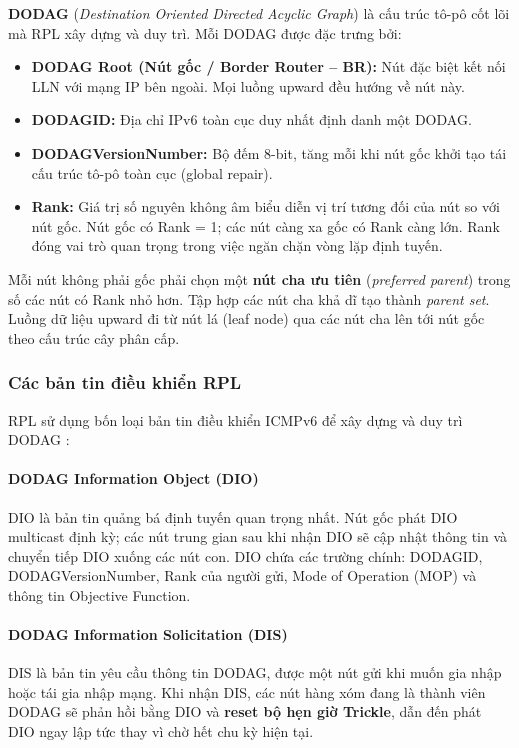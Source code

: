 \textbf{DODAG} (\textit{Destination Oriented Directed Acyclic Graph}) là
cấu trúc tô-pô cốt lõi mà RPL xây dựng và duy trì. Mỗi DODAG được đặc
trưng bởi:

\begin{itemize}
    \item \textbf{DODAG Root (Nút gốc / Border Router -- BR):} Nút đặc
          biệt kết nối LLN với mạng IP bên ngoài. Mọi luồng upward đều
          hướng về nút này.
    \item \textbf{DODAGID:} Địa chỉ IPv6 toàn cục duy nhất định danh
          một DODAG.
    \item \textbf{DODAGVersionNumber:} Bộ đếm 8-bit, tăng mỗi khi nút
          gốc khởi tạo tái cấu trúc tô-pô toàn cục (global repair).
    \item \textbf{Rank:} Giá trị số nguyên không âm biểu diễn vị trí
          tương đối của nút so với nút gốc. Nút gốc có Rank = 1; các
          nút càng xa gốc có Rank càng lớn. Rank đóng vai trò quan trọng
          trong việc ngăn chặn vòng lặp định tuyến.
\end{itemize}

Mỗi nút không phải gốc phải chọn một \textbf{nút cha ưu tiên}
(\textit{preferred parent}) trong số các nút có Rank nhỏ hơn. Tập hợp
các nút cha khả dĩ tạo thành \textit{parent set}. Luồng dữ liệu upward
đi từ nút lá (leaf node) qua các nút cha lên tới nút gốc theo cấu trúc
cây phân cấp.

\subsubsection{Các bản tin điều khiển RPL}

RPL sử dụng bốn loại bản tin điều khiển ICMPv6 để xây dựng và duy trì
DODAG \cite{prajisha2025dis}:

\paragraph{DODAG Information Object (DIO)}
DIO là bản tin quảng bá định tuyến quan trọng nhất. Nút gốc phát DIO
multicast định kỳ; các nút trung gian sau khi nhận DIO sẽ cập nhật thông
tin và chuyển tiếp DIO xuống các nút con. DIO chứa các trường chính:
DODAGID, DODAGVersionNumber, Rank của người gửi, Mode of Operation (MOP)
và thông tin Objective Function.

\paragraph{DODAG Information Solicitation (DIS)}
DIS là bản tin yêu cầu thông tin DODAG, được một nút gửi khi muốn gia
nhập hoặc tái gia nhập mạng. Khi nhận DIS, các nút hàng xóm đang là thành
viên DODAG sẽ phản hồi bằng DIO và \textbf{reset bộ hẹn giờ Trickle},
dẫn đến phát DIO ngay lập tức thay vì chờ hết chu kỳ hiện tại.

